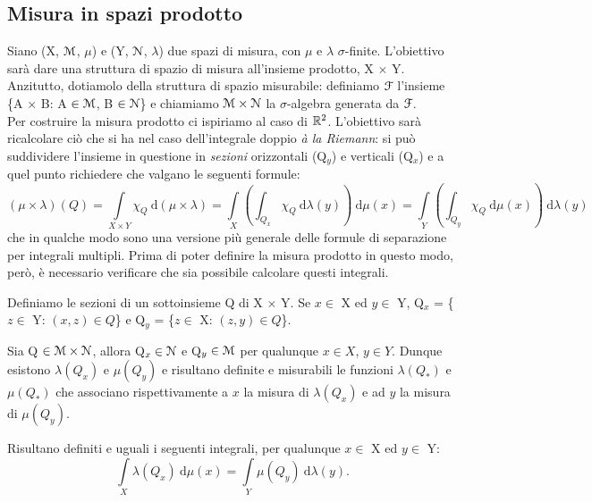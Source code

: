 \documentclass[Completo.tex]{subfiles}
\begin{document}
	\subsection{Misura in spazi prodotto} Siano (X, $\eu[M]$, $\mu$) e (Y, $\eu[N]$, $\lambda$) due spazi di misura, con $\mu$ e $\lambda$ $\sigma$-finite. L'obiettivo sarà dare una struttura di spazio di misura all'insieme prodotto, X $\times$ Y. Anzitutto, dotiamolo della struttura di spazio misurabile: definiamo $\eu[F]$ l'insieme \{A $\times$ B: A $\in \eu[M]$, B $\in \eu[N]$\} e chiamiamo $\eu[M] \times \eu[N]$ la $\sigma$-algebra generata da $\eu[F]$. \\
	Per costruire la misura prodotto ci ispiriamo al caso di $\bb[R]^2$. L'obiettivo sarà ricalcolare ciò che si ha nel caso dell'integrale doppio \textit{à la Riemann}: si può suddividere l'insieme in questione in \textit{sezioni} orizzontali (Q$_y$) e verticali (Q$_x$) e a quel punto richiedere che valgano le seguenti formule:
	\begin{equation*}
	(\mu \times \lambda)(Q) = \int\limits_{X \times Y} \chi_Q \ \mathrm{d}(\mu \times \lambda) = \int\limits_X \left(\int_{Q_x} \chi_Q \ \mathrm{d}\lambda(y)\right) \ \mathrm{d}\mu(x) = \int\limits_Y \left(\int_{Q_y} \chi_Q \ \mathrm{d}\mu(x)\right) \ \mathrm{d}\lambda(y) 
	\end{equation*}
	che in qualche modo sono una versione più generale delle formule di separazione per integrali multipli. Prima di poter definire la misura prodotto in questo modo, però, è necessario verificare che sia possibile calcolare questi integrali.
	\begin{Def}
		Definiamo le sezioni di un sottoinsieme Q di X $\times$ Y. Se $x \in$ X ed $y \in$ Y, Q$_x$ = \{$z \in$ Y: $(x, z) \in Q$\} e Q$_y$ = \{$z \in$ X: $(z, y) \in Q$\}.
	\end{Def}
	\begin{Prop}
		Sia Q $\in \eu[M] \times \eu[N]$, allora Q$_x \in \eu[N]$ e Q$_y \in \eu[M]$ per qualunque $x \in X$, $y \in Y$. Dunque esistono $\lambda(Q_x)$ e $\mu(Q_y)$ e risultano definite e misurabili le funzioni $\lambda(Q_{*})$ e $\mu(Q_{*})$ che associano rispettivamente a $x$ la misura di $\lambda(Q_x)$ e ad $y$ la misura di $\mu(Q_y)$.
	\end{Prop}
	\begin{Th}
		Risultano definiti e uguali i seguenti integrali, per qualunque $x \in$ X ed $y \in$ Y:
		\begin{equation*}
		\int\limits_X \lambda(Q_x) \ \mathrm{d}\mu(x) = \int\limits_Y \mu(Q_y) \ \mathrm{d}\lambda(y).
		\end{equation*}
	\end{Th}
\end{document}
